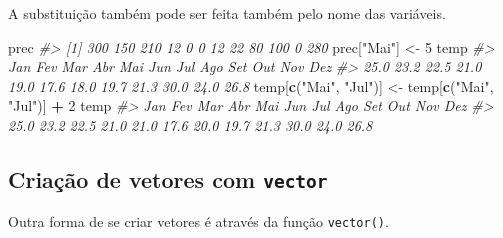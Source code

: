 \documentclass[]{book}
\newenvironment{Shaded}{\begin{snugshade}}{\end{snugshade}}
\newcommand{\KeywordTok}[1]{\textcolor[rgb]{0.13,0.29,0.53}{\textbf{#1}}}
\newcommand{\DecValTok}[1]{\textcolor[rgb]{0.00,0.00,0.81}{#1}}
\newcommand{\StringTok}[1]{\textcolor[rgb]{0.31,0.60,0.02}{#1}}
\newcommand{\CommentTok}[1]{\textcolor[rgb]{0.56,0.35,0.01}{\textit{#1}}}
\newcommand{\OperatorTok}[1]{\textcolor[rgb]{0.81,0.36,0.00}{\textbf{#1}}}
\newcommand{\NormalTok}[1]{#1}
\begin{document}
A substituição também pode ser feita também pelo nome das variáveis.

\begin{Shaded}
\begin{Highlighting}[]
\NormalTok{prec}
\CommentTok{#>  [1] 300 150 210  12   0   0  12  22  80 100   0 280}
\NormalTok{prec[}\StringTok{"Mai"}\NormalTok{] <-}\StringTok{ }\DecValTok{5}
\NormalTok{temp}
\CommentTok{#>  Jan  Fev  Mar  Abr  Mai  Jun  Jul  Ago  Set  Out  Nov  Dez }
\CommentTok{#> 25.0 23.2 22.5 21.0 19.0 17.6 18.0 19.7 21.3 30.0 24.0 26.8}
\NormalTok{temp[}\KeywordTok{c}\NormalTok{(}\StringTok{"Mai"}\NormalTok{, }\StringTok{"Jul"}\NormalTok{)] <-}\StringTok{ }\NormalTok{temp[}\KeywordTok{c}\NormalTok{(}\StringTok{"Mai"}\NormalTok{, }\StringTok{"Jul"}\NormalTok{)] }\OperatorTok{+}\StringTok{ }\DecValTok{2}
\NormalTok{temp}
\CommentTok{#>  Jan  Fev  Mar  Abr  Mai  Jun  Jul  Ago  Set  Out  Nov  Dez }
\CommentTok{#> 25.0 23.2 22.5 21.0 21.0 17.6 20.0 19.7 21.3 30.0 24.0 26.8}
\end{Highlighting}
\end{Shaded}

\subsection{\texorpdfstring{Criação de vetores com
\texttt{vector}}{Criação de vetores com vector}}\label{criacao-de-vetores-com-vector}

Outra forma de se criar vetores é através da função \texttt{vector()}.
\end{document}
